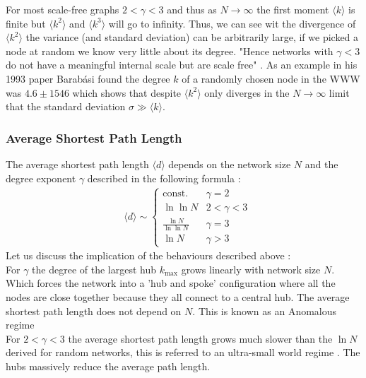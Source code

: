 \documentclass{article}
\begin{document}
                For most scale-free graphs $2<\gamma<3$ and thus as $N\to \infty$ the first moment $\langle k \rangle$ is finite but $\langle k^2 \rangle$ and $\langle k^3 \rangle$ will go to infinity. Thus, we can see wit the divergence of $\langle k^2 \rangle$ the variance (and standard deviation) can be arbitrarily large, if we picked a node at random we know very little about its degree. "Hence networks with $\gamma<3$ do not have a meaningful internal scale but are scale free" \parencite{barabasi2013network}. As an example in his 1993 paper Barabási found the degree $k$ of a randomly chosen node in the WWW was $4.6 \pm 1546$ which shows that despite $\langle k^2 \rangle$ only diverges in the $N \to \infty$ limit that the standard deviation $\sigma \gg  \langle k \rangle$.\\
            \subsubsection{Average Shortest Path Length}
            The average shortest path length $\langle d \rangle$ depends on the network size $N$ and the degree exponent $\gamma$ described in the following formula \parencite{bollobas2004diameter}\parencite{cohen2003scale}:\\
            \begin{align*}
                &\langle d \rangle \sim
                \begin{cases}
                    \text{const.} &\gamma =2\\
                    \ln\ln N  &2<\gamma<3\\
                    \frac{\ln N}{\ln\ln N}  &\gamma = 3\\
                    \ln N  &\gamma>3
                \end{cases}
            \end{align*}
            Let us discuss the implication of the behaviours described above \parencite{barabasi2013network}:\\
            For $\gamma$ the degree of the largest hub $k_{\text{max}}$ grows linearly with network size $N$. Which forces the network into a 'hub and spoke' configuration where all the nodes are close together because they all connect to a central hub. The average shortest path length does not depend on $N$. This is known as an Anomalous regime\\
            For $2<\gamma<3$ the average shortest path length grows much slower than the $\ln N$ derived for random networks, this is referred to an ultra-small world regime \parencite{cohen2003scale}. The hubs massively reduce the average path length.\\
\end{document}
